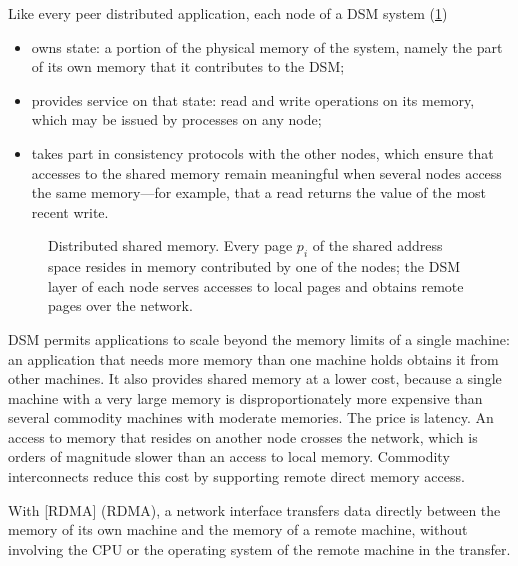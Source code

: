 \documentclass[../main.tex]{subfiles}
\begin{document}
Like every peer distributed application, each node of a DSM system
(\cref{fig:l15-dsm})
\begin{itemize}
  \item owns state: a portion of the physical memory of the system, namely
    the part of its own memory that it contributes to the DSM;
  \item provides service on that state: read and write operations on its
    memory, which may be issued by processes on any node;
  \item takes part in consistency protocols with the other nodes, which
    ensure that accesses to the shared memory remain meaningful when
    several nodes access the same memory---for example, that a read returns
    the value of the most recent write.
\end{itemize}

\begin{figure}[htbp]
  \centering
  
  \caption{Distributed shared memory.  Every page $p_i$ of the shared
    address space resides in memory contributed by one of the nodes; the
    DSM layer of each node serves accesses to local pages and obtains
    remote pages over the network.}
  \label{fig:l15-dsm}
\end{figure}

DSM permits applications to scale beyond the memory limits of a single
machine: an application that needs more memory than one machine holds
obtains it from other machines.  It also provides shared memory at a lower
cost, because a single machine with a very large memory is
disproportionately more expensive than several commodity machines with
moderate memories.  The price is latency.  An access
to memory that resides on another node crosses the network, which is orders
of magnitude slower than an access to local memory.  Commodity
interconnects reduce this cost by supporting remote direct memory access.

\begin{definition}
  With [RDMA]%
   (RDMA), a network interface
  transfers data directly between the memory of its own machine and the
  memory of a remote machine, without involving the CPU or the operating
  system of the remote machine in the transfer.
\end{definition}
\end{document}
